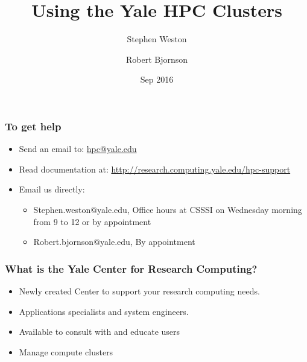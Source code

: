 \documentclass[10pt]{beamer}
\title{Using the Yale HPC Clusters}
\author{{Stephen Weston} \and {Robert Bjornson}}
\institute[Yale]{
  Yale Center for Research Computing \\
  Yale University
}
\date{Sep 2016}
\begin{document}
\begin{frame}[plain]
  \titlepage
\end{frame}

\begin{frame}
\frametitle{To get help}
\begin{itemize}
\item Send an email to: \url{hpc@yale.edu}
\item Read documentation at: \url{http://research.computing.yale.edu/hpc-support}
\item Email us directly:
\begin{itemize}
\item Stephen.weston@yale.edu, Office hours at CSSSI on Wednesday morning from 9 to 12 or by appointment
\item Robert.bjornson@yale.edu, By appointment
\end{itemize}
\end{itemize}
\end{frame}

\begin{frame}
\frametitle{What is the Yale Center for Research Computing?}

\begin{itemize}
\item Newly created Center to support your research computing needs.
\item Applications specialists and system engineers.
\item Available to consult with and educate users
\item Manage compute clusters
\end{itemize}
\end{frame}
\end{document}
